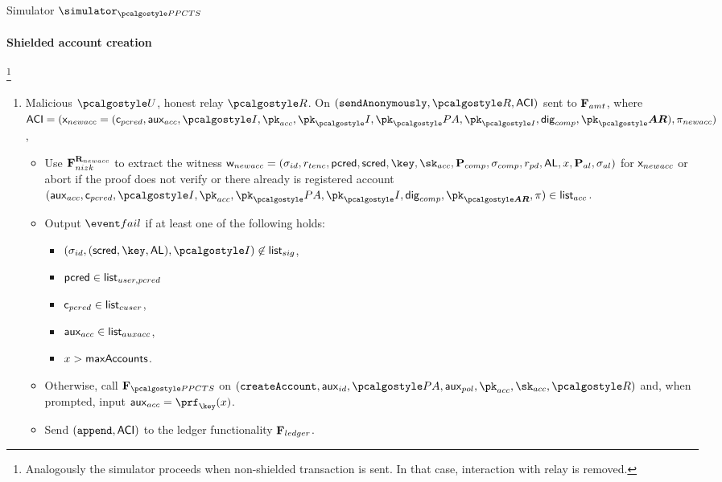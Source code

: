 \documentclass[runningheads,10pt]{llncs}
\numberwithin{equation}{section}
\begin{document}
\begin{simbox}{Simulator $\simulator_{\PPCTS}$}
  \paragraph{Shielded account creation}\footnote{Analogously the simulator proceeds
    when non-shielded transaction is sent. In that case, interaction with relay is removed.} 
  \begin{enumerate}
  \item Malicious $\user$, honest relay $\relay$. On $(\sendAnonymously, \relay, \aci)$ sent to $\mathbf{F}_{{amt}}$, where
      $\aci = (\inp_{newacc}=(\cuser, \auxacc, \idprov, \pk_{acc}, \pk_\idprov, \pk_\polas,
      \pk_{\idprov}, \policydig, \vec{\pk_\ar}),
      \zkproof_{newacc})$,
    \begin{itemize}
    \item Use $\mathbf{F}_{{nizk}}^{\mathbf{R}_{newacc}}$ to extract the witness
      $\wit_{newacc} = (\signature_{id}, r_{tenc}, \pcred, \scred, \key, \sk_{acc},
      \comppolicy, \signature_{comp}, r_{pd}, \AL, x, \alpolicy, \signature_{al})$ for
      $\mathsf{x}_{newacc}$ or abort if the proof does not verify or there already is
      registered account
      $(\aux_{acc}, \cuser, \idprov, \pk_{acc}, \pk_\polas, \pk_\idprov, \policydig,
      \vec{\pk_{\ar}}, \zkproof) \in \listvar{acc}$.
    \item Output $\fail$ if at least one of the following holds:
      \begin{itemize}
      \item $(\signature_{id}, (\scred, \key, \AL), \idprov) \not\in \listvar{sig}$,
      \item $\mathsf{pcred} \in {\mathsf{list}_{user,pcred}}$ 
      \item $\mathsf{c}_{pcred} \in {\mathsf{list}_{cuser}}$, 
      \item $\mathsf{aux}_{acc} \in {\mathsf{list}_{auxacc}}$, 
      \item $x > \mathsf{maxAccounts}$. 
      \end{itemize}
    \item Otherwise, call $\func{\PPCTS}$ on
      $(\createAccount, \aux_{id}, \polas, \auxpol, \pk_{acc}, \sk_{acc},
      \relay)$ and, when prompted, input $\aux_{acc} = \prf_\key(x)$.
    \item Send $(\mathtt{append}, \mathsf{ACI})$ to the ledger functionality $\mathbf{F}_{{ledger}}$.
    \end{itemize}


\end{enumerate}
\end{simbox}
\end{document}
